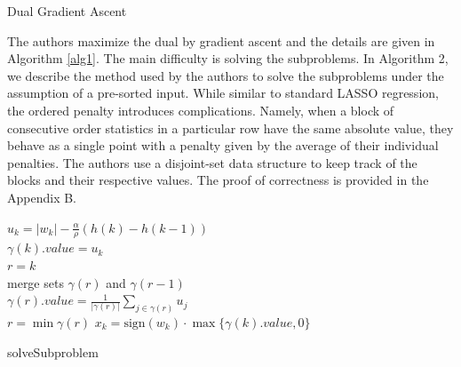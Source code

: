 \documentclass{uwstat572}
\theoremstyle{remark}
\theoremstyle{definition}
\begin{document}
\begin{algorithm}[!htp]
\caption{Dual Gradient Ascent}\label{alg1}
\end{algorithm}

The authors maximize the dual by gradient ascent and the details are given in Algorithm \ref{alg1}.  The main difficulty is solving the subproblems. In Algorithm 2, we describe the method used by the authors to solve the subproblems under the assumption of a pre-sorted input.  While similar to standard LASSO regression, the ordered penalty introduces complications.  Namely, when a block of consecutive order statistics in a particular row have the same absolute value, they behave as a single point with a penalty given by the average of their individual penalties.  The authors use a disjoint-set data structure to keep track of the blocks and their respective values. The proof of correctness is provided in the Appendix B.

\begin{algorithm}[!htp]
    {
        $u_k = |w_k| - \frac{\alpha}{\rho} (h(k) - h(k-1))$
        \\
        $\gamma(k).value = u_k$
        \\
        $r = k$
        \\
            {
                merge sets $\gamma(r)$ and $\gamma(r-1)$
                \\
                $\gamma(r).value = \frac{1}{|\gamma(r)|} \sum_{j \in \gamma(r)} u_j$
                \\
                $r = \min \gamma(r)$
        }
    }
    {
        $x_k = {\text{sign}}(w_k) \cdot \max\{\gamma(k).value,0\}$
    }
    \caption{solveSubproblem}\label{alg2}
\end{algorithm}
\end{document}
